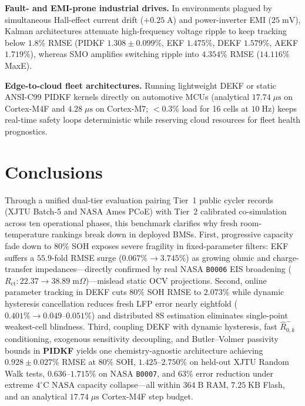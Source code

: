 \documentclass[11pt,a4paper]{article}
\providecommand{\upmu}{\mu}
\begin{document}
\textbf{Fault- and EMI-prone industrial drives.} In environments plagued by simultaneous Hall-effect current drift ($+0.25\;\mathrm{A}$) and power-inverter EMI ($25\;\mathrm{mV}$), Kalman architectures attenuate high-frequency voltage ripple to keep tracking below $1.8\%$ RMSE (PIDKF $1.308\pm0.099\%$, EKF $1.475\%$, DEKF $1.579\%$, AEKF $1.719\%$), whereas SMO amplifies switching ripple into $4.354\%$ RMSE ($14.116\%$ MaxE).

\textbf{Edge-to-cloud fleet architectures.} Running lightweight DEKF or static ANSI-C99 PIDKF kernels directly on automotive MCUs (analytical $17.74\;\upmu\mathrm{s}$ on Cortex-M4F and $4.28\;\upmu\mathrm{s}$ on Cortex-M7; $<0.3\%$ load for 16 cells at $10\;\mathrm{Hz}$) keeps real-time safety loops deterministic while reserving cloud resources for fleet health prognostics.

\section{Conclusions}
Through a unified dual-tier evaluation pairing Tier~1 public cycler records (XJTU Batch-5 and NASA Ames PCoE) with Tier~2 calibrated co-simulation across ten operational phases, this benchmark clarifies why fresh room-temperature rankings break down in deployed BMSs. First, progressive capacity fade down to $80\%$ SOH exposes severe fragility in fixed-parameter filters: EKF suffers a $55.9$-fold RMSE surge ($0.067\% \rightarrow 3.745\%$) as growing ohmic and charge-transfer impedances---directly confirmed by real NASA \texttt{B0006} EIS broadening ($R_{\text{ct}}: 22.37 \rightarrow 38.89\;\mathrm{m}\Omega$)---mislead static OCV projections. Second, online parameter tracking in DEKF cuts $80\%$ SOH RMSE to $2.073\%$ while dynamic hysteresis cancellation reduces fresh LFP error nearly eightfold ($0.401\% \rightarrow 0.049\text{--}0.051\%$) and distributed 8S estimation eliminates single-point weakest-cell blindness. Third, coupling DEKF with dynamic hysteresis, fast $\hat{R}_{0,k}^-$ conditioning, exogenous sensitivity decoupling, and Butler--Volmer passivity bounds in \textbf{PIDKF} yields one chemistry-agnostic architecture achieving $0.928\pm0.027\%$ RMSE at $80\%$ SOH, $1.425\text{--}2.750\%$ on held-out XJTU Random Walk tests, $0.636\text{--}1.715\%$ on NASA \texttt{B0007}, and $63\%$ error reduction under extreme $4^\circ\text{C}$ NASA capacity collapse---all within $364\;\mathrm{B}$ RAM, $7.25\;\mathrm{KB}$ Flash, and an analytical $17.74\;\upmu\mathrm{s}$ Cortex-M4F step budget.
\end{document}
